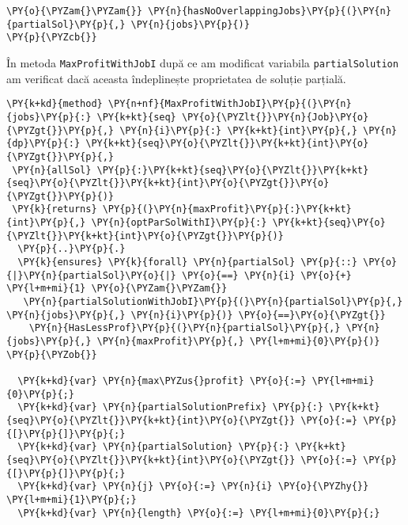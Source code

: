 \begin{enumerate}
\begin{Verbatim}[commandchars=\\\{\}, fontsize=\footnotesize]
   \PY{o}{\PYZam{}\PYZam{}} \PY{n}{hasNoOverlappingJobs}\PY{p}{(}\PY{n}{partialSol}\PY{p}{,} \PY{n}{jobs}\PY{p}{)}
\PY{p}{\PYZcb{}}
\end{Verbatim}
În metoda \texttt{MaxProfitWithJobI} după ce am modificat variabila \texttt{partialSolution} am verificat dacă aceasta îndeplinește proprietatea de soluție parțială.
\begin{Verbatim}[commandchars=\\\{\},fontsize=\footnotesize]
\PY{k+kd}{method} \PY{n+nf}{MaxProfitWithJobI}\PY{p}{(}\PY{n}{jobs}\PY{p}{:} \PY{k+kt}{seq} \PY{o}{\PYZlt{}}\PY{n}{Job}\PY{o}{\PYZgt{}}\PY{p}{,} \PY{n}{i}\PY{p}{:} \PY{k+kt}{int}\PY{p}{,} \PY{n}{dp}\PY{p}{:} \PY{k+kt}{seq}\PY{o}{\PYZlt{}}\PY{k+kt}{int}\PY{o}{\PYZgt{}}\PY{p}{,}
 \PY{n}{allSol} \PY{p}{:}\PY{k+kt}{seq}\PY{o}{\PYZlt{}}\PY{k+kt}{seq}\PY{o}{\PYZlt{}}\PY{k+kt}{int}\PY{o}{\PYZgt{}}\PY{o}{\PYZgt{}}\PY{p}{)}
 \PY{k}{returns} \PY{p}{(}\PY{n}{maxProfit}\PY{p}{:}\PY{k+kt}{int}\PY{p}{,} \PY{n}{optParSolWithI}\PY{p}{:} \PY{k+kt}{seq}\PY{o}{\PYZlt{}}\PY{k+kt}{int}\PY{o}{\PYZgt{}}\PY{p}{)}
  \PY{p}{..}\PY{p}{.}
  \PY{k}{ensures} \PY{k}{forall} \PY{n}{partialSol} \PY{p}{::} \PY{o}{|}\PY{n}{partialSol}\PY{o}{|} \PY{o}{==} \PY{n}{i} \PY{o}{+} \PY{l+m+mi}{1} \PY{o}{\PYZam{}\PYZam{}}
   \PY{n}{partialSolutionWithJobI}\PY{p}{(}\PY{n}{partialSol}\PY{p}{,} \PY{n}{jobs}\PY{p}{,} \PY{n}{i}\PY{p}{)} \PY{o}{==}\PY{o}{\PYZgt{}}
    \PY{n}{HasLessProf}\PY{p}{(}\PY{n}{partialSol}\PY{p}{,} \PY{n}{jobs}\PY{p}{,} \PY{n}{maxProfit}\PY{p}{,} \PY{l+m+mi}{0}\PY{p}{)}
\PY{p}{\PYZob{}}

  \PY{k+kd}{var} \PY{n}{max\PYZus{}profit} \PY{o}{:=} \PY{l+m+mi}{0}\PY{p}{;}
  \PY{k+kd}{var} \PY{n}{partialSolutionPrefix} \PY{p}{:} \PY{k+kt}{seq}\PY{o}{\PYZlt{}}\PY{k+kt}{int}\PY{o}{\PYZgt{}} \PY{o}{:=} \PY{p}{[}\PY{p}{]}\PY{p}{;}
  \PY{k+kd}{var} \PY{n}{partialSolution} \PY{p}{:} \PY{k+kt}{seq}\PY{o}{\PYZlt{}}\PY{k+kt}{int}\PY{o}{\PYZgt{}} \PY{o}{:=} \PY{p}{[}\PY{p}{]}\PY{p}{;}
  \PY{k+kd}{var} \PY{n}{j} \PY{o}{:=} \PY{n}{i} \PY{o}{\PYZhy{}} \PY{l+m+mi}{1}\PY{p}{;}
  \PY{k+kd}{var} \PY{n}{length} \PY{o}{:=} \PY{l+m+mi}{0}\PY{p}{;}
  

\end{Verbatim}
\end{enumerate}
